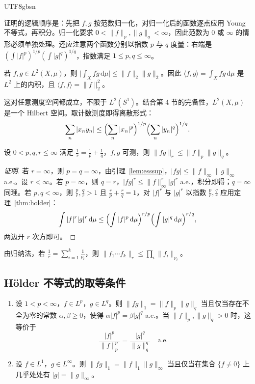 \documentclass[11pt]{article}
\newcommand{\norm}[1]{\lVert #1\rVert}
\newcommand{\dmu}{\,\mathrm{d}\mu}
\begin{document}
\begin{CJK*}{UTF8}{gbsn}
\begin{remark}
证明的逻辑顺序是：先把 $f,g$ 按范数归一化，对归一化后的函数逐点应用 Young 不等式，再积分。归一化要求 $0<\norm{f}_{p},\norm{g}_{q}<\infty$，因此范数为 $0$ 或 $\infty$ 的情形必须单独处理。还应注意两个函数分别以指数 $p$ 与 $q$ 度量：右端是 $(\int|f|^{p})^{1/p}(\int|g|^{q})^{1/q}$，指数满足 $1\le p,q\le\infty$。
\end{remark}

\begin{corollary}\label{cor:cs}
若 $f,g\in L^{2}(X,\mu)$，则 $\bigl|\int_{X}f\bar{g}\dmu\bigr|\le\norm{f}_{2}\norm{g}_{2}$。因此 $\langle f,g\rangle=\int_{X}f\bar{g}\dmu$ 是 $L^{2}$ 上的内积，且 $\langle f,f\rangle=\norm{f}_{2}^{2}$。
\end{corollary}

这对任意测度空间都成立，不限于 $L^{2}(S^{1})$。结合第 4 节的完备性，$L^{2}(X,\mu)$ 是一个 Hilbert 空间。取计数测度即得离散形式：
\[
\sum_{n}|x_{n}y_{n}|\le\Bigl(\sum_{n}|x_{n}|^{p}\Bigr)^{1/p}\Bigl(\sum_{n}|y_{n}|^{q}\Bigr)^{1/q}.
\]

\begin{corollary}\label{cor:gen-holder}
设 $0<p,q,r\le\infty$ 满足 $\frac1r=\frac1p+\frac1q$，$f,g$ 可测，则 $\norm{fg}_{r}\le\norm{f}_{p}\norm{g}_{q}$。
\end{corollary}

\begin{proof}[证明]
若 $r=\infty$，则 $p=q=\infty$，由引理~\ref{lem:esssup}，$|fg|\le\norm{f}_{\infty}\norm{g}_{\infty}$ a.e.。设 $r<\infty$。若 $p=\infty$，则 $q=r$，$|fg|^{r}\le\norm{f}_{\infty}^{r}|g|^{r}$ a.e.，积分即得；$q=\infty$ 同理。若 $p,q<\infty$，则 $\frac{p}{r},\frac{q}{r}>1$ 且 $\frac{r}{p}+\frac{r}{q}=1$，对 $|f|^{r}$ 与 $|g|^{r}$ 以指数 $\frac pr,\frac qr$ 应用定理~\ref{thm:holder}：
\[
\int|f|^{r}|g|^{r}\dmu\le\Bigl(\int|f|^{p}\dmu\Bigr)^{r/p}\Bigl(\int|g|^{q}\dmu\Bigr)^{r/q},
\]
两边开 $r$ 次方即可。
\end{proof}

由归纳法，若 $\frac1r=\sum_{i=1}^{k}\frac{1}{p_{i}}$，则 $\norm{f_{1}\cdots f_{k}}_{r}\le\prod_{i}\norm{f_{i}}_{p_{i}}$。

\subsection{Hölder 不等式的取等条件}

\begin{theorem}\label{thm:holder-eq}
\begin{enumerate}
\item 设 $1<p<\infty$，$f\in L^{p}$，$g\in L^{q}$。则 $\norm{fg}_{1}=\norm{f}_{p}\norm{g}_{q}$ 当且仅当存在不全为零的常数 $\alpha,\beta\ge0$，使得 $\alpha|f|^{p}=\beta|g|^{q}$ a.e.。当 $\norm{f}_{p},\norm{g}_{q}>0$ 时，这等价于
\[
\frac{|f|^{p}}{\norm{f}_{p}^{p}}=\frac{|g|^{q}}{\norm{g}_{q}^{q}}\quad\text{a.e.}
\]
\item 设 $f\in L^{1}$，$g\in L^{\infty}$。则 $\norm{fg}_{1}=\norm{f}_{1}\norm{g}_{\infty}$ 当且仅当在集合 $\{f\ne0\}$ 上几乎处处有 $|g|=\norm{g}_{\infty}$。
\end{enumerate}
\end{theorem}


\end{CJK*}
\end{document}
